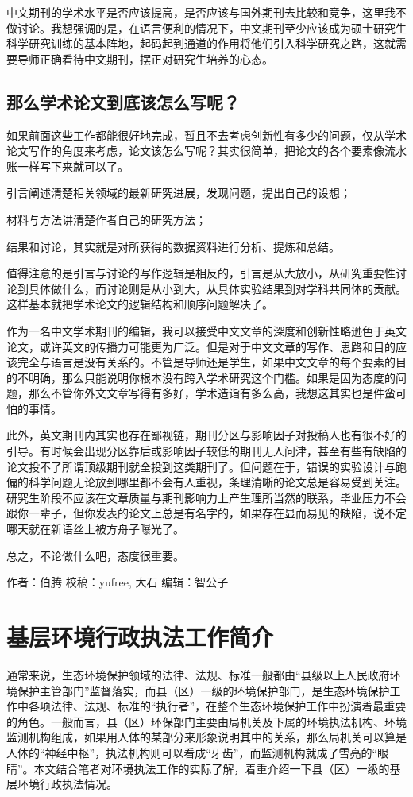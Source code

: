 \documentclass[]{book}
\begin{document}
中文期刊的学术水平是否应该提高，是否应该与国外期刊去比较和竞争，这里我不做讨论。我想强调的是，在语言便利的情况下，中文期刊至少应该成为硕士研究生科学研究训练的基本阵地，起码起到通道的作用将他们引入科学研究之路，这就需要导师正确看待中文期刊，摆正对研究生培养的心态。

\subsection{那么学术论文到底该怎么写呢？}

如果前面这些工作都能很好地完成，暂且不去考虑创新性有多少的问题，仅从学术论文写作的角度来考虑，论文该怎么写呢？其实很简单，把论文的各个要素像流水账一样写下来就可以了。

引言阐述清楚相关领域的最新研究进展，发现问题，提出自己的设想；

材料与方法讲清楚作者自己的研究方法；

结果和讨论，其实就是对所获得的数据资料进行分析、提炼和总结。

值得注意的是引言与讨论的写作逻辑是相反的，引言是从大放小，从研究重要性讨论到具体做什么，而讨论则是从小到大，从具体实验结果到对学科共同体的贡献。这样基本就把学术论文的逻辑结构和顺序问题解决了。

作为一名中文学术期刊的编辑，我可以接受中文文章的深度和创新性略逊色于英文论文，或许英文的传播力可能更为广泛。但是对于中文文章的写作、思路和目的应该完全与语言是没有关系的。不管是导师还是学生，如果中文文章的每个要素的目的不明确，那么只能说明你根本没有跨入学术研究这个门槛。如果是因为态度的问题，那么不管你外文文章写得有多好，学术造诣有多么高，我想这其实也是件蛮可怕的事情。

此外，英文期刊内其实也存在鄙视链，期刊分区与影响因子对投稿人也有很不好的引导。有时候会出现分区靠后或影响因子较低的期刊无人问津，甚至有些有缺陷的论文投不了所谓顶级期刊就全投到这类期刊了。但问题在于，错误的实验设计与跑偏的科学问题无论放到哪里都不会有人重视，条理清晰的论文总是容易受到关注。研究生阶段不应该在文章质量与期刊影响力上产生理所当然的联系，毕业压力不会跟你一辈子，但你发表的论文上总是有名字的，如果存在显而易见的缺陷，说不定哪天就在新语丝上被方舟子曝光了。

总之，不论做什么吧，态度很重要。

作者：伯腾 校稿：yufree, 大石 编辑：智公子

\section{基层环境行政执法工作简介}

通常来说，生态环境保护领域的法律、法规、标准一般都由``县级以上人民政府环境保护主管部门''监督落实，而县（区）一级的环境保护部门，是生态环境保护工作中各项法律、法规、标准的``执行者''，在整个生态环境保护工作中扮演着最重要的角色。一般而言，县（区）环保部门主要由局机关及下属的环境执法机构、环境监测机构组成，如果用人体的某部分来形象说明其中的关系，那么局机关可以算是人体的``神经中枢''，执法机构则可以看成``牙齿''，而监测机构就成了雪亮的``眼睛''。本文结合笔者对环境执法工作的实际了解，着重介绍一下县（区）一级的基层环境行政执法情况。
\end{document}
